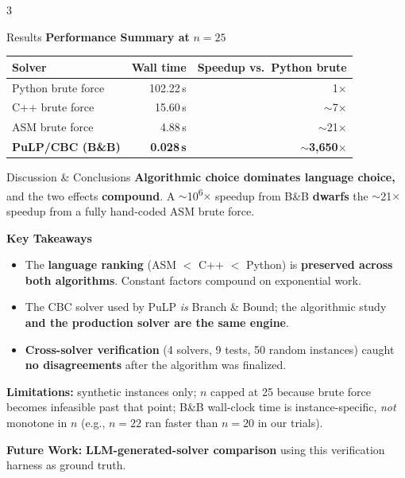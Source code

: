 \documentclass[a0,portrait]{a0poster}
\newcommand{\kw}[1]{\textcolor{BCDarkBlue}{\textbf{#1}}}
\newcommand{\KW}[1]{\textcolor{BCRed}{\textbf{#1}}}
\begin{document}
\begin{multicols}{3}
\begin{posterblock}{Results}
\vspace{0.1em}
\textbf{Performance Summary at} \boldmath$n = 25$\unboldmath

\vspace{0.3em}
\renewcommand{\arraystretch}{1.35}
\centering
\begin{tabular}{@{}lrr@{}}
\toprule
\textbf{Solver} & \textbf{Wall time} & \textbf{Speedup vs.\ Python brute} \\
\midrule
Python brute force & 102.22\,s & 1$\times$              \\
C++ brute force    & 15.60\,s  & $\sim$7$\times$        \\
ASM brute force    & 4.88\,s   & $\sim$21$\times$       \\
\rowcolor{BCLightBlue}\textbf{PuLP/CBC (B\&B)} & \textbf{0.028\,s} & \KW{$\sim$3{,}650$\times$} \\
\bottomrule
\end{tabular}
\RaggedRight
\end{posterblock}

\begin{posterblock}{Discussion \& Conclusions}
\KW{Algorithmic choice dominates language choice,} and the two effects \kw{compound}. A $\sim$10\textsuperscript{6}$\times$ speedup from B\&B \kw{dwarfs} the $\sim$21$\times$ speedup from a fully hand-coded ASM brute force.

\vspace{0.5em}
\textbf{Key Takeaways}
\begin{itemize}[leftmargin=1.4em,itemsep=4pt,topsep=4pt]
  \item The \kw{language ranking} (ASM $<$ C++ $<$ Python) is \KW{preserved across both algorithms}. Constant factors compound on exponential work.
  \item The CBC solver used by PuLP \emph{is} Branch \& Bound; the algorithmic study \kw{and the production solver are the same engine}.
  \item \kw{Cross-solver verification} (4 solvers, 9 tests, 50 random instances) caught \KW{no disagreements} after the algorithm was finalized.
\end{itemize}

\vspace{0.3em}
\textbf{Limitations:} synthetic instances only; $n$ capped at 25 because brute force becomes infeasible past that point; B\&B wall-clock time is instance-specific, \emph{not} monotone in $n$ (e.g., $n = 22$ ran faster than $n = 20$ in our trials).

\vspace{0.3em}
\textbf{Future Work:} \kw{LLM-generated-solver comparison} using this verification harness as ground truth.
\end{posterblock}


\end{multicols}
\end{document}
